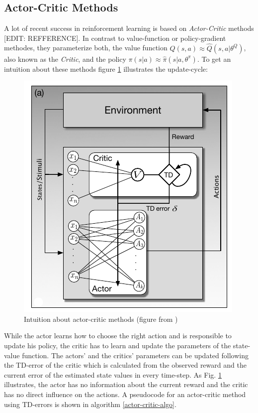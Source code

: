 \subsection{Actor-Critic Methods}
\label{sec:actor-critic}
A lot of recent success in reinforcement learning is based on \textit{Actor-Critic} methods [EDIT: REFFERENCE].
In contrast to value-function or policy-gradient methodes, they parameterize both, the value function $Q(s,a) \approx \hat{Q}(s,a|\theta^Q)$, also known as the \textit{Critic}, and the policy $\pi(s|a) \approx  \hat{\pi}(s|a,\theta^\pi)$. To get an intuition about these methods figure \ref{fig:actor-critic} illustrates the update-cycle:
\begin{figure}[H]
	\centering
	\includegraphics[width=0.4\linewidth]{actor-critic}
	\caption{Intuition about actor-critic methods (figure from 
	\cite{sutton2018reinforcement})}
	\label{fig:actor-critic}
\end{figure}
While the actor learns how to choose the right action and is responsible to update his policy, the critic has to learn and update the parameters of the state-value function. The actors' and the 
critics' parameters can be updated following the TD-error of the critic which is calculated from 
the observed reward and the current error of the estimated state values in every time-step. As Fig. 
\ref{fig:actor-critic} illustrates, the actor has no information about the 
current reward and the critic has no direct influence on the actions.  
A pseudocode for an actor-critic method using TD-errors is shown in algorithm \ref{actor-critic-algo}.
